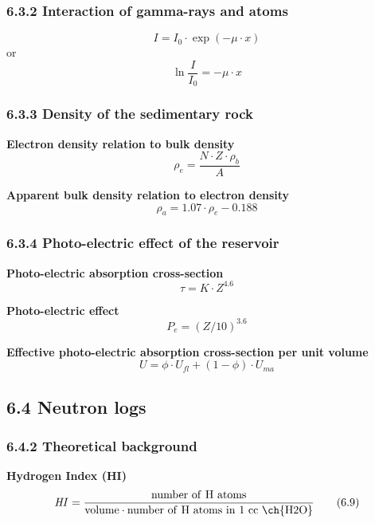 \subsubsection{6.3.2 Interaction of gamma-rays and atoms}
\begin{equation*}
    I = I_0\cdot\exp(-\mu\cdot x)\tag{6.2}
\end{equation*}
or
\begin{equation*}
    \ln{\frac{I}{I_0}} = -\mu\cdot x\tag{6.3}
\end{equation*}

\subsubsection{6.3.3 Density of the sedimentary rock}
\textbf{Electron density relation to bulk density}
\begin{equation*}
    \rho_e = \frac{N\cdot Z\cdot \rho_b}{A}\tag{6.4}
\end{equation*}

\textbf{Apparent bulk density relation to electron density}
\begin{equation*}
    \rho_a = 1.07\cdot\rho_e - 0.188\tag{6.5}
\end{equation*}

\subsubsection{6.3.4 Photo-electric effect of the reservoir}
\textbf{Photo-electric absorption cross-section}
\begin{equation*}
    \tau = K\cdot Z^{4.6}\tag{6.6}
\end{equation*}

\textbf{Photo-electric effect}
\begin{equation*}
    P_e = (Z / 10)^{3.6}\tag{6.7}
\end{equation*}

\textbf{Effective photo-electric absorption cross-section per unit volume}
\begin{equation*}
    U = \phi\cdot U_{fl} + (1-\phi)\cdot U_{ma}\tag{6.8}
\end{equation*}

\subsection{6.4 Neutron logs}
\subsubsection{6.4.2 Theoretical background}
\textbf{Hydrogen Index (HI)}
\begin{equation*}
    \mathit{HI} = \frac{\mathrm{number\ of\ H\ atoms}}{\mathrm{volume}\cdot \mathrm{number\ of\ H\ atoms\ in\ 1\ cc\ \ch{H2O}}}\tag{6.9}
\end{equation*}

